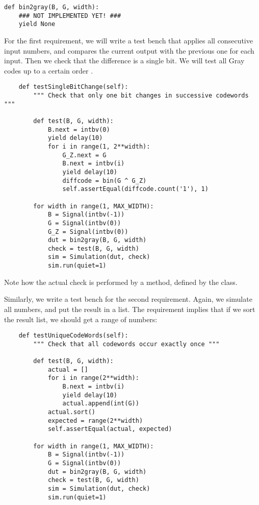 \begin{verbatim}
def bin2gray(B, G, width):
    ### NOT IMPLEMENTED YET! ###
    yield None
\end{verbatim}

For the first requirement, we will write a test bench that applies all
consecutive input numbers, and compares the current output with the
previous one for each input. Then we check that the difference is a
single bit. We will test all Gray codes up to a certain order
.

\begin{verbatim}
    def testSingleBitChange(self):
        """ Check that only one bit changes in successive codewords """
        
        def test(B, G, width):
            B.next = intbv(0)
            yield delay(10)
            for i in range(1, 2**width):
                G_Z.next = G
                B.next = intbv(i)
                yield delay(10)
                diffcode = bin(G ^ G_Z)
                self.assertEqual(diffcode.count('1'), 1)
        
        for width in range(1, MAX_WIDTH):
            B = Signal(intbv(-1))
            G = Signal(intbv(0))
            G_Z = Signal(intbv(0))
            dut = bin2gray(B, G, width)
            check = test(B, G, width)
            sim = Simulation(dut, check)
            sim.run(quiet=1)
\end{verbatim}

Note how the actual check is performed by a 
method, defined by the  class.

Similarly, we write a test bench for the second requirement. Again, we
simulate all numbers, and put the result in a list. The requirement
implies that if we sort the result list, we should get a range of
numbers:

\begin{verbatim}
    def testUniqueCodeWords(self):
        """ Check that all codewords occur exactly once """

        def test(B, G, width):
            actual = []
            for i in range(2**width):
                B.next = intbv(i)
                yield delay(10)
                actual.append(int(G))
            actual.sort()
            expected = range(2**width)
            self.assertEqual(actual, expected)
       
        for width in range(1, MAX_WIDTH):
            B = Signal(intbv(-1))
            G = Signal(intbv(0))
            dut = bin2gray(B, G, width)
            check = test(B, G, width)
            sim = Simulation(dut, check)
            sim.run(quiet=1)
\end{verbatim}


